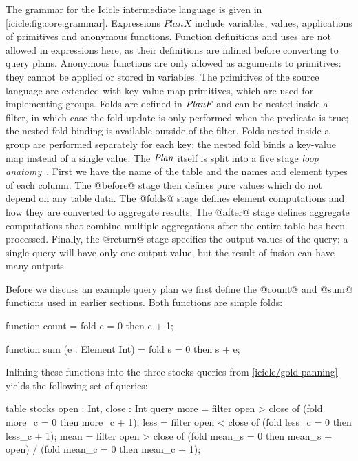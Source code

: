 The grammar for the Icicle intermediate language is given in \cref{icicle:fig:core:grammar}.
Expressions $PlanX$ include variables, values, applications of primitives and anonymous functions.
Function definitions and uses are not allowed in expressions here, as their definitions are inlined before converting to query plans.
Anonymous functions are only allowed as arguments to primitives: they cannot be applied or stored in variables.
The primitives of the source language are extended with key-value map primitives, which are used for implementing groups.
Folds are defined in $\mathit{PlanF}$ and can be nested inside a filter, in which case the fold update is only performed when the predicate is true; the nested fold binding is available outside of the filter.
Folds nested inside a group are performed separately for each key; the nested fold binds a key-value map instead of a single value.
The $\mathit{Plan}$ itself is split into a five stage \emph{loop anatomy}~\cite{shivers2005anatomy}.
First we have the name of the table and the names and element types of each column.
The @before@ stage then defines pure values which do not depend on any table data.
The @folds@ stage defines element computations and how they are converted to aggregate results.
The @after@ stage defines aggregate computations that combine multiple aggregations after the entire table has been processed.
Finally, the @return@ stage specifies the output values of the query; a single query will have only one output value, but the result of fusion can have many outputs.


Before we discuss an example query plan we first define the @count@ and @sum@ functions used in earlier sections.
Both functions are simple folds:
\begin{icicle}
function count
 = fold c = 0 then c + 1;

function sum (e : Element Int)
 = fold s = 0 then s + e;
\end{icicle}

Inlining these functions into the three stocks queries from \cref{icicle/gold-panning} yields the following set of queries:

\begin{icicle}
table stocks { open : Int, close : Int }
query 
  more = filter open > close of (fold more_c = 0 then more_c + 1);
  less = filter open < close of (fold less_c = 0 then less_c + 1);
  mean = filter open > close of
      (fold mean_s = 0 then mean_s + open) / (fold mean_c = 0 then mean_c + 1);
\end{icicle}

